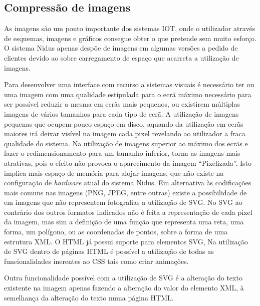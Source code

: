 \subsection{Compressão de imagens}\label{compressimaage}

\par As imagens são um ponto importante dos sistemas IOT, onde o utilizador através de esquemas, imagens e gráficos consegue obter o que pretende sem muito esforço. O sistema Nidus apenas despõe de imagens em algumas versões a pedido de clientes devido ao sobre carregamento de espaço que acarreta a utilização de imagens.
\par Para desenvolver uma interface com recurso a sistemas visuais é necessário ter ou uma imagem com uma qualidade estipulada para o ecrã máximo necessário para ser possível reduzir a mesma em ecrãs mais pequenos, ou existirem múltiplas imagens de vários tamanhos para cada tipo de ecrã. A utilização de imagens pequenas que ocupem pouco espaço em disco, aquando da utilização em ecrãs maiores irá deixar visível na imagem cada pixel revelando ao utilizador a fraca qualidade do sistema. Na utilização de imagens superior ao máximo dos ecrãs e fazer o redimensionamento para um tamanho inferior, torna as imagens mais atrativas, pois o efeito não provoca o aparecimento da imagem “Pixelizada”. Isto implica mais espaço de memória para alojar imagens, que não existe na configuração de \textit{hardware} atual do sistema Nidus. Em alternativa às codificações mais comuns nas imagens (PNG, JPEG, entre outras) existe a possibilidade de em imagens que não representem fotografias a utilização de SVG. No SVG ao contrário dos outros formatos indicados não é feita a representação de cada pixel da imagem, mas sim a definição de uma função que representa uma reta, uma forma, um polígono, ou as coordenadas de pontos, sobre a forma de uma estrutura XML. O HTML já possui suporte  para elementos SVG, Na utilização de SVG dentro de páginas HTML é possível a utilização de todas as funcionalidades inerentes ao CSS tais como criar animações. 
\par Outra funcionalidade possível com a utilização de SVG é a alteração do texto existente na imagem apenas fazendo a alteração do valor do elemento XML, à semelhança da alteração do texto numa página HTML.

